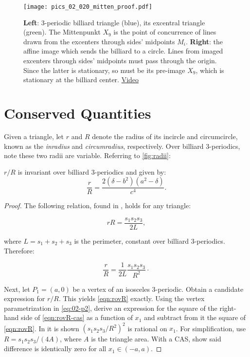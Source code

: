 \begin{figure}
     \centering
    \texttt{[image: pics\_02\_020\_mitten\_proof.pdf]}
     \caption{\textbf{Left}: 3-periodic billiard triangle (blue), its excentral triangle (green). The Mittenpunkt $X_9$ is the point of concurrence of lines drawn from the excenters through sides' midpoints $M_i$. \textbf{Right}: the affine image which sends the billiard to a circle. Lines from imaged excenters through sides' midpoints must pass through the origin. Since the latter is stationary, so must be its pre-image $X_9$, which is stationary at the billiard center.  %
     \href{https://youtu.be/tMrBqfRBYik}{Video}}
     \label{fig:02-x9} 
\end{figure}

\section{Conserved Quantities}

Given a triangle, let $r$ and $R$ denote the radius of its incircle and circumcircle, known as the {\em inradius} and {\em circumradius}, respectively. Over billiard 3-periodics, note these two radii are variable. Referring to \cref{fig:radii}:

\begin{theorem}
$r/R$ is invariant over billiard 3-periodics and given by:
\begin{equation*}
\label{eqn:rovR}
\frac{r}{R}=\frac{2 (\delta-b^2)(a^2-\delta)}{c^4}.
\end{equation*}
\label{thm:02-confocal-rovR}
\end{theorem}

\begin{proof}
The following relation, found in \cite{johnson1960}, holds for any triangle:

\begin{equation*}
 r R=\frac{s_1s_2s_3}{2 L}, 
\end{equation*}

\noindent where $L=s_1+s_2+s_3$ is the perimeter, constant over billiard 3-periodics. Therefore:

\begin{equation}
\frac{r}{R}=\frac{1}{2L} \frac{s_1s_2s_3}{R^2}\cdot
\label{eqn:rovR-cas}
\end{equation}

Next, let $P_1=(a,0)$ be a vertex of an isosceles 3-periodic. Obtain a candidate expression for $r/R$. This yields \eqref{eqn:rovR} exactly. Using the vertex parametrization in \cref{eq:02-p2}, derive an expression for the square of the right-hand side of \eqref{eqn:rovR-cas} as a function of $x_1$ and subtract from it the square of \eqref{eqn:rovR}. In  \cite{garcia2020-new-properties}
it is shown $\left(s_1s_2s_3/R^2\right)^2$ is rational on $x_1$. For simplification, use $R=s_1 s_2 s_3/(4A)$, where $A$ is the triangle area. With a CAS, show said difference is identically zero for all $x_1\in(-a,a)$.
\end{proof}


